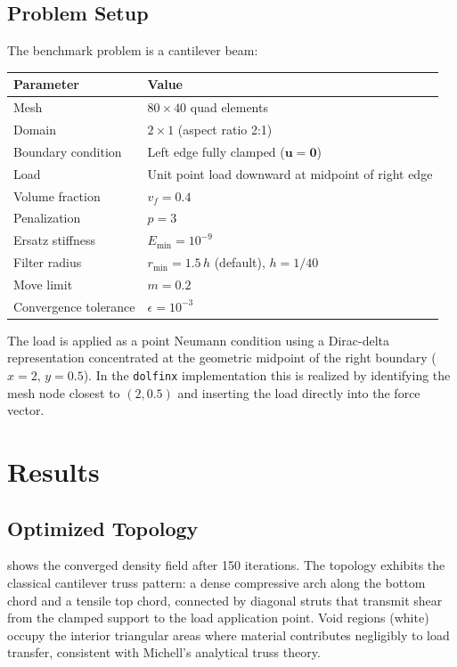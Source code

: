 \documentclass[11pt,a4paper]{article}
\begin{document}
\subsection{Problem Setup}

The benchmark problem is a cantilever beam:

\begin{center}
\begin{tabular}{ll}
\toprule
Parameter & Value \\
\midrule
Mesh & $80 \times 40$ quad elements \\
Domain & $2 \times 1$ (aspect ratio 2:1) \\
Boundary condition & Left edge fully clamped ($\mathbf{u} = \mathbf{0}$) \\
Load & Unit point load downward at midpoint of right edge \\
Volume fraction & $v_f = 0.4$ \\
Penalization & $p = 3$ \\
Ersatz stiffness & $E_{\min} = 10^{-9}$ \\
Filter radius & $r_\mathrm{min} = 1.5\,h$ (default), $h = 1/40$ \\
Move limit & $m = 0.2$ \\
Convergence tolerance & $\epsilon = 10^{-3}$ \\
\bottomrule
\end{tabular}
\end{center}

The load is applied as a point Neumann condition using a Dirac-delta
representation concentrated at the geometric midpoint of the right
boundary ($x = 2$, $y = 0.5$).  In the \texttt{dolfinx} implementation
this is realized by identifying the mesh node closest to $(2, 0.5)$ and
inserting the load directly into the force vector.

\section{Results}
\label{sec:results}

\subsection{Optimized Topology}

 shows the converged density field after 150
iterations.  The topology exhibits the classical cantilever truss pattern:
a dense compressive arch along the bottom chord and a tensile top chord,
connected by diagonal struts that transmit shear from the clamped support
to the load application point.  Void regions (white) occupy the
interior triangular areas where material contributes negligibly to load
transfer, consistent with Michell's analytical truss theory.
\end{document}
